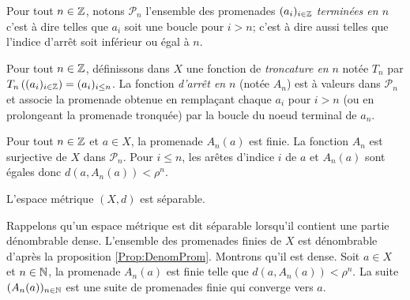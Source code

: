 \begin{defin}
 Pour tout $n\in \mathbb{Z}$, notons $\mathcal{P}_n$ l'ensemble des promenades $(a_i)_{i\in \mathbb{Z}}$ \emph{terminées en $n$} c'est à dire telles que $a_i$ soit une boucle pour $i > n$; c'est à dire aussi telles que l'indice d'arrêt soit inférieur ou égal à $n$.
 \end{defin}
\begin{defin}
 Pour tout $n\in \mathbb{Z}$, définissons dans $X$ une fonction de \emph{troncature en} $n$ notée  $T_n$ par $T_n\left((a_i)_{i\in \mathbb{Z}}\right) = (a_i)_{i\leq n}$.
 La fonction \emph{d'arrêt en} $n$ (notée $A_n$) est à valeurs dans $\mathcal{P}_n$ et associe la promenade obtenue en remplaçant chaque $a_i$ pour $i>n$ (ou en prolongeant la promenade tronquée) par la boucle du noeud terminal de $a_n$.
\end{defin}
\begin{rems}
Pour tout $n\in \mathbb{Z}$ et $a\in X$, la promenade $A_n(a)$ est finie. La fonction $A_n$ est surjective de $X$ dans $\mathcal{P}_n$.\newline
Pour $i\leq n$, les arêtes d'indice $i$ de $a$ et $A_n(a)$ sont égales donc $d(a,A_n(a))< \rho^n$.
\end{rems}

\begin{propn}\label{prop:PromSep}
 L'espace métrique $(X,d)$ est séparable.
\end{propn}
\begin{demo}
 Rappelons qu'un espace métrique est dit séparable lorsqu'il contient une partie dénombrable dense.\newline
 L'ensemble des promenades finies de $X$ est dénombrable d'après la proposition \ref{Prop:DenomProm}. Montrons qu'il est dense.\newline
 Soit $a\in X$ et $n\in \mathbb{N}$, la promenade $A_n(a)$ est finie telle que $d(a,A_n(a)) < \rho^n$. La suite $(A_n(a))_{n\in \mathbb{N}}$ est une suite de promenades finie qui converge vers $a$.
\end{demo}

